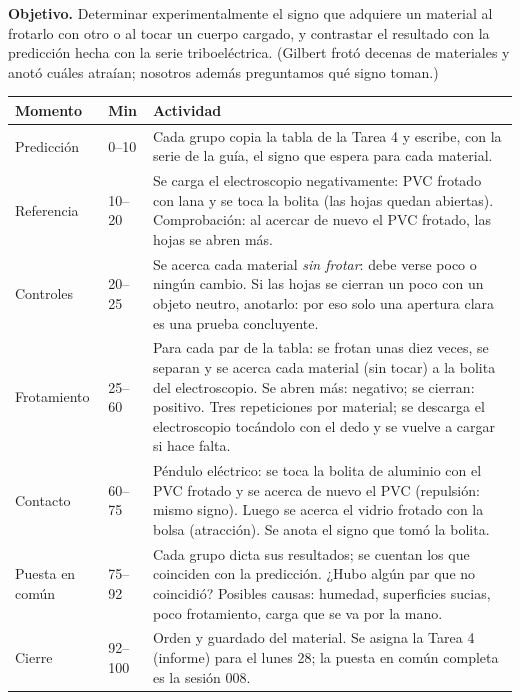 \documentclass[11pt]{article}
\begin{document}

\textbf{Objetivo.} Determinar experimentalmente el signo que adquiere un material al
frotarlo con otro o al tocar un cuerpo cargado, y contrastar el resultado con la predicción
hecha con la serie triboeléctrica. (Gilbert frotó decenas de materiales y anotó cuáles
atraían; nosotros además preguntamos qué signo toman.)

\begin{center}
{\renewcommand{\arraystretch}{1.3}
\begin{tabularx}{\linewidth}{@{}l l X@{}}
  \toprule
  \textbf{Momento} & \textbf{Min} & \textbf{Actividad}\\
  \midrule
  Predicción & 0–10 & Cada grupo copia la tabla de la Tarea 4 y escribe, con la serie de
    la guía, el signo que espera para cada material.\\
  Referencia & 10–20 & Se carga el electroscopio negativamente: PVC frotado con lana y se
    toca la bolita (las hojas quedan abiertas). Comprobación: al acercar de nuevo el PVC
    frotado, las hojas se abren más.\\
  Controles & 20–25 & Se acerca cada material \emph{sin frotar}: debe verse poco o ningún
    cambio. Si las hojas se cierran un poco con un objeto neutro, anotarlo: por eso solo una
    apertura clara es una prueba concluyente.\\
  Frotamiento & 25–60 & Para cada par de la tabla: se frotan unas diez veces, se separan y se
    acerca cada material (sin tocar) a la bolita del electroscopio. Se abren más: negativo; se
    cierran: positivo. Tres repeticiones por material; se descarga el electroscopio tocándolo
    con el dedo y se vuelve a cargar si hace falta.\\
  Contacto & 60–75 & Péndulo eléctrico: se toca la bolita de aluminio con el PVC frotado y se
    acerca de nuevo el PVC (repulsión: mismo signo). Luego se acerca el vidrio frotado con la
    bolsa (atracción). Se anota el signo que tomó la bolita.\\
  Puesta en común & 75–92 & Cada grupo dicta sus resultados; se cuentan los que coinciden
    con la predicción. ¿Hubo algún par que no coincidió? Posibles causas: humedad, superficies
    sucias, poco frotamiento, carga que se va por la mano.\\
  Cierre & 92–100 & Orden y guardado del material. Se asigna la Tarea 4 (informe) para el
    lunes 28; la puesta en común completa es la sesión 008.\\
  \bottomrule
\end{tabularx}}
\end{center}
\end{document}

